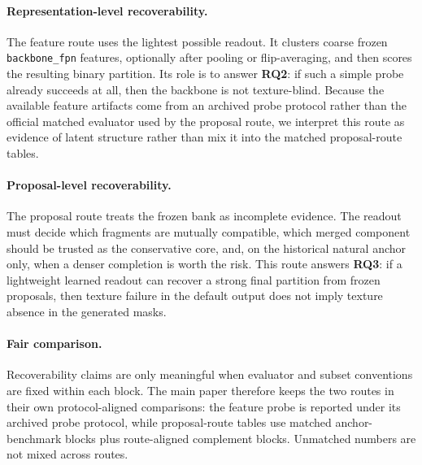 \paragraph{Representation-level recoverability.} The feature route uses the lightest possible readout. It clusters coarse frozen \texttt{backbone\_fpn} features, optionally after pooling or flip-averaging, and then scores the resulting binary partition. Its role is to answer \textbf{RQ2}: if such a simple probe already succeeds at all, then the backbone is not texture-blind. Because the available feature artifacts come from an archived probe protocol rather than the official matched evaluator used by the proposal route, we interpret this route as evidence of latent structure rather than mix it into the matched proposal-route tables.

\paragraph{Proposal-level recoverability.} The proposal route treats the frozen bank as incomplete evidence. The readout must decide which fragments are mutually compatible, which merged component should be trusted as the conservative core, and, on the historical natural anchor only, when a denser completion is worth the risk. This route answers \textbf{RQ3}: if a lightweight learned readout can recover a strong final partition from frozen proposals, then texture failure in the default output does not imply texture absence in the generated masks.

\paragraph{Fair comparison.} Recoverability claims are only meaningful when evaluator and subset conventions are fixed within each block. The main paper therefore keeps the two routes in their own protocol-aligned comparisons: the feature probe is reported under its archived probe protocol, while proposal-route tables use matched anchor-benchmark blocks plus route-aligned complement blocks. Unmatched numbers are not mixed across routes.



